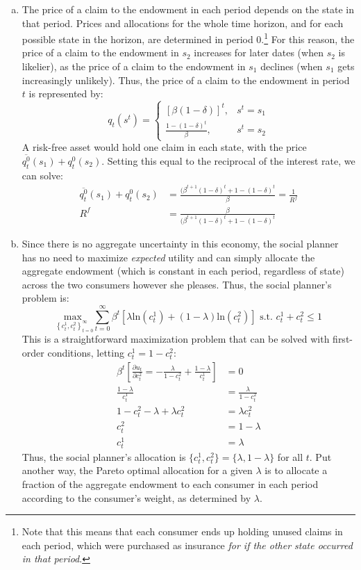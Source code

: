 \documentclass{article}
\newcommand{\loge}[1]{\text{ln}\left(#1\right)}
\newcommand{\usmax}[1]{\underset{#1}{\text{max }}}
\begin{document}
\begin{enumerate}[(a)]
	\item The price of a claim to the endowment in each period depends on the state in that period. Prices and allocations for the whole time horizon, and for each possible state in the horizon, are determined in period 0.\footnote{Note that this means that each consumer ends up holding unused claims in each period, which were purchased as insurance \textit{for if the other state occurred in that period}.} For this reason, the price of a claim to the endowment in $s_2$ increases for later dates (when $s_2$ is likelier), as the price of a claim to the endowment in $s_1$ declines (when $s_1$ gets increasingly unlikely). Thus, the price of a claim to the endowment in period $t$ is represented by:
		\[
			q_t(s^t) = \begin{cases}\left[\beta(1-\delta)\right]^t, & s^t=s_1 \\ \frac{1-(1-\delta)^t}{\beta}, & s^t = s_2 \end{cases}
		\]
	A risk-free asset would hold one claim in each state, with the price ${\overline{q^0_t}(s_1)+q_t^0(s_2)}$. Setting this equal to the reciprocal of the interest rate, we can solve:
		\begin{align*}
			\overline{q^0_t}(s_1)+q_t^0(s_2) &= \frac{(\beta^{t+1}(1-\delta)^t+1-(1-\delta)^t}{\beta} = \frac{1}{R^f}	\\
			R^f &= \frac{\beta}{(\beta^{t+1}(1-\delta)^t+1-(1-\delta)^t}
		\end{align*}
	
	
	\item Since there is no aggregate uncertainty in this economy, the social planner has no need to maximize \textit{expected} utility and can simply allocate the aggregate endowment (which is constant in each period, regardless of state) across the two consumers however she pleases. Thus, the social planner's problem is:
		\[
			\usmax{\left\{c^1_t,c^2_t\right\}_{t=0}^\infty}\sum_{t=0}^\infty\beta^t\left[\lambda\loge{c^1_t}+(1-\lambda)\loge{c^2_t}\right]\text{ s.t. } c^1_t + c^2_t\leq 1
		\]
		This is a straightforward maximization problem that can be solved with first-order conditions, letting ${c^1_t=1-c^2_t}$:
		\begin{align*}
			\beta^t\left[\frac{\partial u_t}{\partial c^2_t} = -\frac{\lambda}{1-c^2_t} + \frac{1-\lambda}{c^1_t} \right]&= 0	\\
			\frac{1-\lambda}{c^1_t} &= \frac{\lambda}{1-c^2_t} \\
			1-c^2_t-\lambda+\lambda c^2_t &= \lambda c_t^2 	\\
			c^2_t &= 1-\lambda \\
			c^1_t &= \lambda
		\end{align*}
		Thus, the social planner's allocation is ${\{c^1_t,c^2_t\}=\{\lambda,1-\lambda\}}$ for all $t$. Put another way, the Pareto optimal allocation for a given $\lambda$ is to allocate a fraction of the aggregate endowment to each consumer in each period according to the consumer's weight, as determined by $\lambda$.
	

\end{enumerate}
\end{document}
